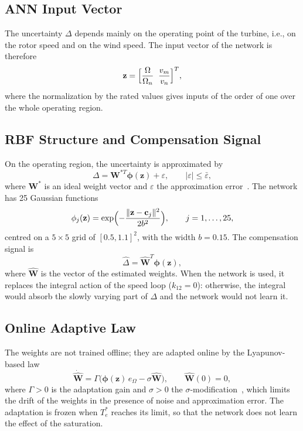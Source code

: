 \documentclass[11pt,a4paper]{article}
\newcommand{\bv}[1]{\mathbf{#1}}
\begin{document}
\subsection{ANN Input Vector}
The uncertainty $\Delta$ depends mainly on the operating point of the turbine, i.e., on the rotor speed
and on the wind speed. The input vector of the network is therefore
\begin{equation}
\bv{z}=\Bigl[\frac{\Omega}{\Omega_n}\;\;\frac{v_m}{v_n}\Bigr]^T ,
\label{eq:z}
\end{equation}
where the normalization by the rated values gives inputs of the order of one over the whole operating
region.

\subsection{RBF Structure and Compensation Signal}
On the operating region, the uncertainty is approximated by
\begin{equation}
\Delta=\bv{W}^{*T}\boldsymbol\phi(\bv{z})+\varepsilon,\qquad |\varepsilon|\le\bar\varepsilon ,
\label{eq:approx}
\end{equation}
where $\bv{W}^*$ is an ideal weight vector and $\varepsilon$ the approximation error~\cite{park1991}. The
network has 25 Gaussian functions
\begin{equation}
\phi_j(\bv{z})=\exp\Bigl(-\frac{\|\bv{z}-\bv{c}_j\|^2}{2b^2}\Bigr),\qquad j=1,\dots,25,
\label{eq:phi}
\end{equation}
centred on a $5\times5$ grid of $[0.5,1.1]^2$, with the width $b=0.15$. The compensation signal is
\begin{equation}
\hat\Delta=\hat{\bv{W}}^T\boldsymbol\phi(\bv{z}) ,
\label{eq:dh}
\end{equation}
where $\hat{\bv{W}}$ is the vector of the estimated weights. When the network is used, it replaces the
integral action of the speed loop ($k_{12}=0$): otherwise, the integral would absorb the slowly varying
part of $\Delta$ and the network would not learn it.

\subsection{Online Adaptive Law}
The weights are not trained offline; they are adapted online by the Lyapunov-based law
\begin{equation}
\dot{\hat{\bv{W}}} = \Gamma\bigl(\boldsymbol\phi(\bv{z})\,e_\Omega - \sigma\hat{\bv{W}}\bigr),\qquad
\hat{\bv{W}}(0)=0,
\label{eq:law}
\end{equation}
where $\Gamma>0$ is the adaptation gain and $\sigma>0$ the $\sigma$-modification~\cite{ioannou1996},
which limits the drift of the weights in the presence of noise and approximation error. The adaptation
is frozen when $T_e^*$ reaches its limit, so that the network does not learn the effect of the
saturation.
\end{document}
